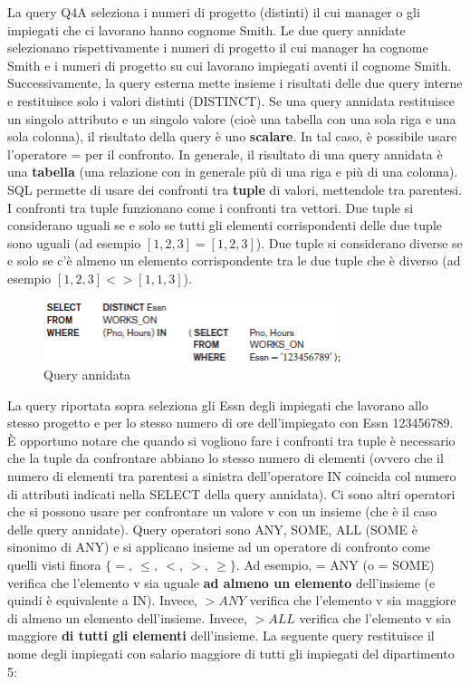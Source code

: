 \begin{itemize}
La query Q4A seleziona i numeri di progetto (distinti) il cui manager o gli impiegati che ci lavorano hanno cognome Smith. Le due query annidate selezionano rispettivamente i numeri di progetto il cui manager ha cognome Smith e i numeri di progetto su cui lavorano impiegati aventi il cognome Smith. Successivamente, la query esterna mette insieme i risultati delle due query interne e restituisce solo i valori distinti (DISTINCT). Se una query annidata restituisce un singolo attributo e un singolo valore (cioè una tabella con una sola riga e una sola colonna), il risultato della query è uno \textbf{scalare}. In tal caso, è possibile usare l’operatore = per il confronto. In generale, il risultato di una query annidata è una \textbf{tabella} (una relazione con in generale più di una riga e più di una colonna). SQL permette di usare dei confronti tra \textbf{tuple} di valori, mettendole tra parentesi. I confronti tra tuple funzionano come i confronti tra vettori. Due tuple si considerano uguali se e solo se tutti gli elementi corrispondenti delle due tuple sono uguali (ad esempio $[1,2,3] = [1,2,3]$). Due tuple si considerano diverse se e solo se c’è almeno un elemento corrispondente tra le due tuple che è diverso (ad esempio $[1,2,3] <> [1,1,3]$). 

\begin{center}
\begin{figure}[H]
\centering
\includegraphics[scale=1]{figures/IN2.png}
\caption{Query annidata} 
\end{figure}
\end{center}

La query riportata sopra seleziona gli Essn degli impiegati che lavorano allo stesso progetto e per lo stesso numero di ore dell’impiegato con Essn 123456789. È opportuno notare che quando si vogliono fare i confronti tra tuple è necessario che la tuple da confrontare abbiano lo stesso numero di elementi (ovvero che il numero di elementi tra parentesi a sinistra dell’operatore IN coincida col numero di attributi indicati nella SELECT della query annidata). 
Ci sono altri operatori che si possono usare per confrontare un valore v con un insieme (che è il caso delle query annidate). Query operatori sono ANY, SOME, ALL (SOME è sinonimo di ANY) e si applicano insieme ad un operatore di confronto come quelli visti finora $\{=,\ \leq,\ <,\ >,\ \geq\}$. Ad esempio, = ANY (o = SOME) verifica che l’elemento v sia uguale \textbf{ad almeno un elemento} dell’insieme (e quindi è equivalente a IN). Invece, $> ANY$ verifica che l’elemento v sia maggiore di almeno un elemento dell’insieme. Invece, $> ALL$ verifica che l’elemento v sia maggiore \textbf{di tutti gli elementi} dell’insieme. La seguente query restituisce il nome degli impiegati con salario maggiore di tutti gli impiegati del dipartimento 5: 


\end{itemize}
